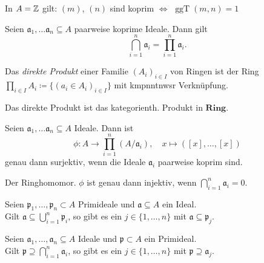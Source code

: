 \documentclass{cheat-sheet}
\DeclareMathOperator{\ggT}{ggT} %
\newcommand{\Ring}{\mathbf{Ring}} %
\newcommand{\aaa}{\mathfrak{a}}
\newcommand{\ppp}{\mathfrak{p}}
\begin{document}
\begin{bsp}
  In $A = \mathbb{Z}$ gilt: \enspace
  $(m)$, $(n)$ sind koprim $\iff$ $\ggT(m, n) = 1$
\end{bsp}

\begin{prop}
  Seien $\aaa_1, \ldots \aaa_n \subseteq A$ paarweise koprime Ideale.
  Dann gilt
  \[
    \bigcap_{i=1}^n \aaa_i = \prod_{i=1}^n \aaa_i.
  \]
\end{prop}


\begin{defn}
  Das \emph{direkte Produkt} einer Familie $(A_i)_{i \in I}$ von Ringen ist der Ring ${\prod}_{i \in I} A_i \coloneqq \{ (a_i \in A_i)_{i \in I} \}$ mit kmpnntnwsr Verknüpfung.
\end{defn}

\begin{bem}
  Das direkte Produkt ist das kategorienth. Produkt in $\Ring$.
\end{bem}

\begin{prop}
  Seien $\aaa_1, \ldots \aaa_n \subseteq A$ Ideale.
  Dann ist
  \[
    \phi : A \to \prod_{i=1}^n (A/\aaa_i), \quad x \mapsto ([x], \ldots, [x])
  \]
  genau dann surjektiv, wenn die Ideale $\aaa_i$ paarweise koprim sind.
\end{prop}

\begin{bem}
  Der Ringhomomor. $\phi$ ist genau dann injektiv, wenn $\bigcap_{i=1}^n \aaa_i = 0$.
\end{bem}


\begin{prop}
  Seien $\ppp_1, \ldots, \ppp_n \subset A$ Primideale und $\aaa \subseteq A$ ein Ideal. \\
  Gilt $\aaa \subseteq \bigcup_{i=1}^n \ppp_i$, so gibt es ein $j \in \{ 1, \ldots, n \}$ mit $\aaa \subseteq \ppp_j$.
\end{prop}

\begin{prop}
  Seien $\aaa_1, \ldots, \aaa_n \subseteq A$ Ideale und $\ppp \subset A$ ein Primideal. \\
  Gilt $\ppp \supseteq \bigcap_{i=1}^n \aaa_i$, so gibt es ein $j \in \{ 1, \ldots, n \}$ mit $\ppp \supseteq \aaa_j$.
\end{prop}
\end{document}
